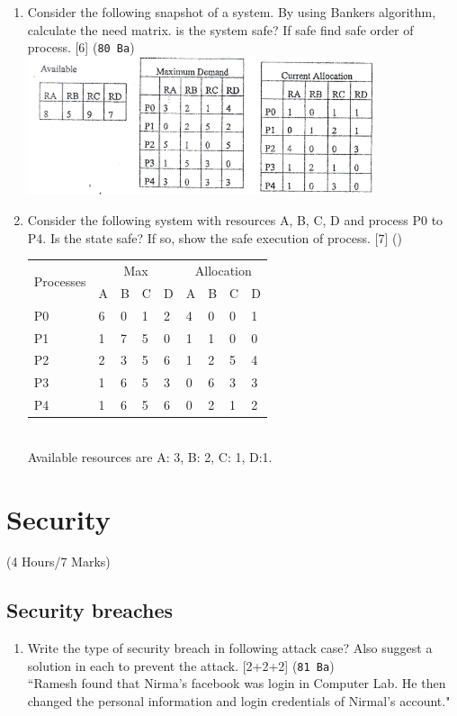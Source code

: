 \documentclass[12pt]{article}
\begin{document}
\begin{enumerate}
			\item Consider the following snapshot of a system. By using Bankers algorithm, calculate the need matrix. is the system safe? If safe find safe order of process. \hfill [6] (\texttt{80 Ba})\\
			\includegraphics[width=4in]{./pics/os_25}

			\item Consider the following system with resources A, B, C, D and process P0 to P4. Is the state safe? If so, show the safe execution of process. \hfill [7] ()\\
			\begin{tabular}{|p{17mm}|p{7mm}|p{7mm}|p{7mm}|p{7mm}||p{7mm}|p{7mm}|p{7mm}|p{7mm}|}
				\hline
				\multirow{2}{*}{Processes} & \multicolumn{4}{|c||}{Max} & \multicolumn{4}{|c|}{Allocation} \\ \cline{2-7}
				& A & B & C & D & A & B & C & D \\ \hline
				P0 & 6 & 0 & 1 & 2 & 4 & 0 & 0 & 1 \\ \hline
				P1 & 1 & 7 & 5 & 0 & 1 & 1 & 0 & 0 \\ \hline
				P2 & 2 & 3 & 5 & 6 & 1 & 2 & 5 & 4 \\ \hline
				P3 & 1 & 6 & 5 & 3 & 0 & 6 & 3 & 3 \\ \hline
				P4 & 1 & 6 & 5 & 6 & 0 & 2 & 1 & 2 \\ \hline
			\end{tabular}\\
			Available resources are A: 3, B: 2, C: 1, D:1.
			
		\end{enumerate}

	\pagebreak

\section{Security}
	\begin{center}(4 Hours/7 Marks)\end{center}
	\subsection{Security breaches}
		\begin{enumerate}
			\item Write the type of security breach in following attack case? Also suggest a solution in each to prevent the attack. \hfill [2+2+2] (\texttt{81 Ba})\\
			``Ramesh found that Nirma's facebook was login in Computer Lab. He then changed the personal information and login credentials of Nirmal's account."
		\end{enumerate}
\end{document}

